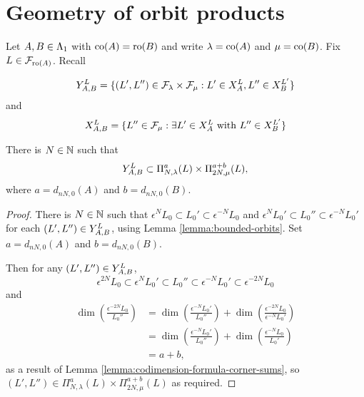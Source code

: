 \documentclass[a4paper, 11pt]{report}
\begin{document}
\section{Geometry of orbit products}

Let $A,B\in\matrices$ with $\co{A}=\ro{B}$ and write $\lambda=\co{A}$ and $\mu=\co{B}$. Fix $L\in\flags_{\ro{A}}$. Recall

\begin{equation*}
\yprod[L]{A,B}=\{(L',L'')\in\flags_{\lambda}\times\flags_{\mu}: L'\in\xprod[L]{A}, L''\in\xprod[L']{B}\}
\end{equation*}
and
\begin{equation*}
\xprod[L]{A,B}=\{L''\in\flags_{\mu}: \exists L'\in\xprod[L]{A} \text{ with } L''\in\xprod[L']{B}\}
\end{equation*}

\begin{lemma}\label{lemma:embedding-orbit-products}
There is $N\in\naturals$ such that
\begin{equation*}
\yprod[L]{A,B}\subset\Pi_{N,\lambda}^a(L)\times\Pi_{2N,\mu}^{a+b}(L),
\end{equation*}
where $a=d_{nN,0}{(A)}$ and $b=d_{nN,0}{(B)}$.
\end{lemma}

\begin{proof}
There is $N\in\naturals$ such that $\epsilon^N{L_0}\subset L_0'\subset\epsilon^{-N}L_0$ and $\epsilon^NL_0'\subset L_0''\subset\epsilon^{-N}L_0'$ for each $(L',L'')\in\yprod[L]{A,B}$, using Lemma \ref{lemma:bounded-orbits}. Set $a=d_{nN,0}{(A)}$ and $b=d_{nN,0}{(B)}$.

Then for any $(L',L'')\in\yprod[L]{A,B}$,
\begin{equation*}
\epsilon^{2N}L_0\subset\epsilon^NL_0'\subset L_0''\subset\epsilon^{-N}L_0'\subset\epsilon^{-2N}L_0
\end{equation*}
and
\begin{align*}
\dim\left(\frac{\epsilon^{-2N}L_0}{L_0''}\right)
&=\dim\left(\frac{\epsilon^{-N}L_0'}{L_0''}\right) + \dim\left(\frac{\epsilon^{-2N}L_0}{\epsilon^{-N}L_0'}\right)\\
&=\dim\left(\frac{\epsilon^{-N}L_0'}{L_0''}\right) + \dim\left(\frac{\epsilon^{-N}L_0}{L_0'}\right)\\
&= a+b,
\end{align*}
as a result of Lemma \ref{lemma:codimension-formula-corner-sums}, so $(L',L'')\in\Pi_{N,\lambda}^a(L)\times\Pi_{2N,\mu}^{a+b}(L)$ as required.
\end{proof}
\end{document}
